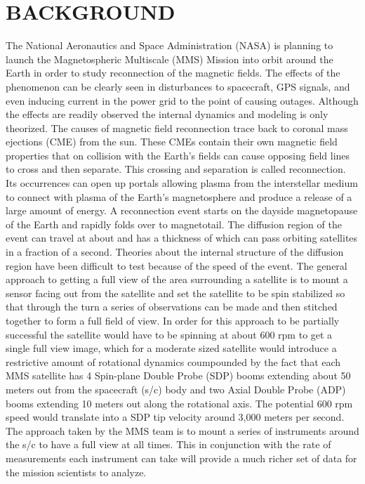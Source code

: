 
\chapter{BACKGROUND}
\label{chap:Background}

The National Aeronautics and Space Administration (NASA) is planning to launch the Magnetospheric Multiscale (MMS) Mission into orbit around the Earth in order to study reconnection of the magnetic fields.  The effects of the phenomenon can be clearly seen in disturbances to spacecraft, GPS signals, and even inducing current in the power grid to the point of causing outages.  Although the effects are readily observed the internal dynamics and modeling is only theorized.  The causes of magnetic field reconnection trace back to coronal mass ejections (CME) from the sun.  These CMEs contain their own magnetic field properties that on collision with the Earth's fields can cause opposing field lines to cross and then separate.  This crossing and separation is called reconnection.  Its occurrences can open up portals allowing plasma from the interstellar medium to connect with plasma of the Earth's magnetosphere and produce a release of a large amount of energy.  A reconnection event starts on the dayside magnetopause of the Earth and
rapidly folds over to magnetotail.  The diffusion region of the event can travel at about  and has a thickness of  which can pass orbiting satellites in a fraction of a second.  Theories about the internal structure of the diffusion region  have been difficult to test because of the speed of the event.  The general approach to getting a full view of the area surrounding a satellite is to mount a sensor facing out from the satellite and set the satellite to be spin stabilized so that through the turn a series of observations can be made and then stitched together to form a full field of view.  In order for this approach to be partially successful the satellite would have to be spinning at about 600 rpm to get a single full view image, which for a moderate sized satellite would introduce a restrictive amount of rotational dynamics coumpounded by the fact that each MMS satellite has 4 Spin-plane Double Probe (SDP) booms  extending about 50 meters out from the spacecraft (s/c) body and two Axial Double Probe (ADP) booms extending 10 meters out along the rotational axis.  The potential 600 rpm speed would translate into a SDP tip velocity around 3,000 meters per second.
The approach taken by the MMS team is to mount a series of instruments around the s/c to have a full view at all times.  This in conjunction with the rate of measurements each instrument can take will provide a much richer set of data for the mission scientists to analyze.


